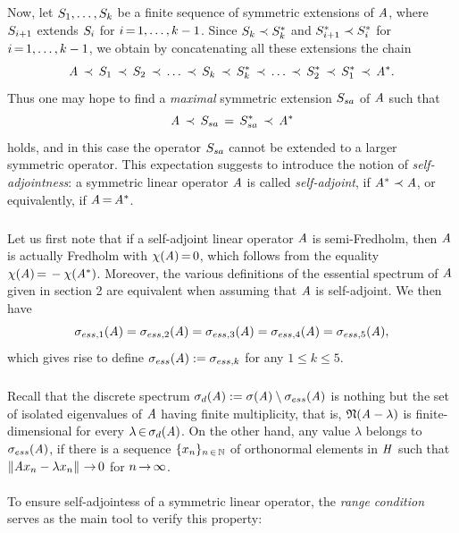 \documentclass[11pt,twoside]{article}
\begin{document}
\begin{itemize}[leftmargin=4mm,itemsep=5pt]
\subparagraph{}
Now,
let ${S}_1,\ldots,{S}_k$ be a finite sequence
of symmetric extensions of $\mathit{A}$,
where ${S}_{i+1}$ extends ${S}_i$ for $i {\,=\,} 1,\ldots,k-1$.
Since ${S}_k \prec {S}_k^*$ and
${S}_{i+1}^* \prec {S}_i^*$ for $i {\,=\,} 1,\ldots,k-1$,
we obtain by concatenating all these extensions the chain
\[
\mathit{A} \, \prec \, {S}_1
\, \prec \,
{S}_2
\, \prec \,
\ldots
\, \prec \,
{S}_k
\, \prec \,
{S}_k^*
\, \prec \,
\ldots
\, \prec \,
{S}_2^*
\, \prec \,
{S}_1^*
\, \prec \,
\mathit{A}^*.
\]
Thus one may hope to find a \textit{maximal} symmetric extension
${S}_{sa}$ of $\mathit{A}$ such that
\[
\mathit{A} \, \prec \, {S}_{sa} \,=\, {S}_{sa}^* \, \prec \, \mathit{A}^*
\]
holds,
and in this case
the operator ${S}_{sa}$ cannot be extended to a larger symmetric operator.
This expectation suggests to introduce the notion of \textit{self-adjointness}:
a symmetric linear operator $\mathit{A}$ is called \textit{self-adjoint},
if $\mathit{A}^* \prec \mathit{A}$,
or equivalently,
if $\mathit{A} {\,=\,} \mathit{A}^*$.

\subparagraph{} %
Let us first note
that if a self-adjoint linear operator $\mathit{A}$ is semi-Fredholm,
then $\mathit{A}$ is actually Fredholm with $\chi(\mathit{A}) {\,=\,} 0$,
which follows from the equality $\chi(\mathit{A}) {\,=\,} - \chi(\mathit{A}^*)$.
Moreover,
the various definitions of the essential spectrum of $\mathit{A}$ given in section 2
are equivalent when assuming that $\mathit{A}$ is self-adjoint.
We then have 
\[
\sigma_{ess,1}(\mathit{A})  =
\sigma_{ess,2}(\mathit{A})  =
\sigma_{ess,3}(\mathit{A})  =
\sigma_{ess,4}(\mathit{A})  =
\sigma_{ess,5}(\mathit{A}),
\]
which gives rise to define $\sigma_{ess}(\mathit{A}) := \sigma_{ess,k}$
for any $1 \leq k \leq 5$.

\subparagraph{} %
Recall that the discrete spectrum
$\sigma_d(\mathit{A}) := \sigma(\mathit{A}) \setminus \sigma_{ess}(\mathit{A})$
is nothing but the set of isolated eigenvalues of $\mathit{A}$
having finite multiplicity,
that is,
$\mathfrak{N}(\mathit{A} - \lambda)$ is finite-dimensional
for every $\lambda {\,\in\,} \sigma_d(\mathit{A})$.
On the other hand,
any value $\lambda$ belongs to $\sigma_{ess}(\mathit{A})$,
if there is a sequence $\{x_n\}_{n {\,\in\,} {\mathbb{N}}}$ of orthonormal elements in $\mathit{H}$
such that $\left\lVert \mathit{A} x_n - \lambda x_n \right\rVert {\,\to\,} 0$ for $n {\,\to\,} \infty$.

\paragraph{} %
To ensure self-adjointess of a symmetric linear operator,
the \textit{range condition} serves as the main tool to verify this property:


\end{itemize}
\end{document}
